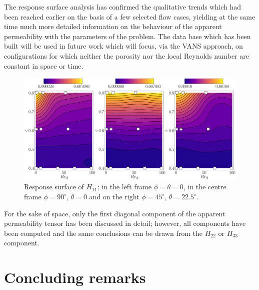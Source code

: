 The response surface analysis has confirmed the qualitative trends which had been reached earlier on the basis of a few selected 
flow cases, yielding at the same time much more detailed information on the behaviour of the apparent permeability with the
parameters of the problem. The data base which has been built will be used in future work which will focus, via the VANS approach,
on configurations for which neither the porosity nor the local Reynolds number are constant in space or time.

\begin{figure}[t]
	\centering
	\includegraphics[width=1\linewidth]{chapter_4/figure/krig_mater_eps_re}
	\caption{Response surface of $H_{11}$; in the left frame $\phi= \theta = 0$, in the centre frame $\phi=90^{\circ}$, $ \theta = 0$ and on the right $\phi= 45^{\circ}$, $ \theta = 22.5^{\circ}$.}
	\label{fig:por}
\end{figure}

For the sake of space, only the first diagonal component of the apparent permeability tensor has been discussed 
in detail; however, all components have been computed and the same conclusions can be drawn from the $H_{22}$ or $H_{33}$ component.


\section{Concluding remarks}

